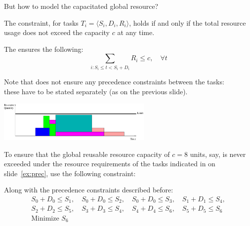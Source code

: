 \documentclass{cons-beamer}
\begin{document}
\begin{frame}{But how to model the capacitated global resource?}
  \begin{definition}
    The  constraint, for tasks \( T_i = \langle S_i, D_i, R_i \rangle \),
    holds if and only if the total resource usage does not exceed the capacity \( c \) at any time.
  \end{definition}
  \vfill

  The  ensures the following:
  \[
  \sum_{i: S_i \leq t < S_i + D_i} R_i \leq c, \quad \forall t
  \]
  \vfill

  Note that  does \alert{not} ensure any
  precedence constraints between the tasks: \\these have to be stated
  separately (as on the previous slide). 
\end{frame}

\begin{frame}
  \begin{center}
    \includegraphics[width=75mm]{images/scheduling1}
  \end{center}
  
  \begin{example}[Cumulative]
    To ensure that the global reusable resource capacity of
    $c = 8$ units, say, is never exceeded under the resource
    requirements of the tasks indicated in  on
    slide~\ref{ex:prec}, use the following constraint: 

    
    Along with the precedence constraints described before:
    \begin{align*}
      S_0 + D_0 \leq S_1, \quad S_0 + D_0 \leq S_2, \quad S_0 + D_0 \leq S_3, \quad S_1 + D_1 \leq S_4, \\ S_2 + D_2 \leq S_5, \quad S_3 + D_3 \leq S_4, \quad S_4 + D_4 \leq S_6, \quad S_5 + D_5 \leq S_6 \\
      \text{Minimize } S_6 
    \end{align*} 
  \end{example}
\end{frame}
\end{document}
